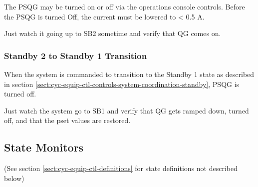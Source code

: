 \documentclass[11pt]{book}		%
\begin{document}
The PSQG may be turned on or off via the operations console controls. Before the PSQG is turned Off, the current must be lowered to < 0.5 A.

\color{red}

Just watch it going up to SB2 sometime and verify that QG comes on.

\color{black}

\subsubsection{Standby 2 to Standby 1 Transition} \label{sect:cyc-equip-ctl-beamline-quad1-state-controls-sb2tosb1}

When the system is commanded to transition to the Standby 1 state as described in section \ref{sect:cyc-equip-ctl-controls-system-coordination-standby}, PSQG is turned off.

\color{red}

Just watch the system go to SB1 and verify that QG gets ramped down, turned off, and that the pset values are restored.

\color{black}


\subsection{State Monitors} \label{sect:cyc-equip-ctl-beamline-quad1-state-monitors}
(See section \ref{sect:cyc-equip-ctl-definitions} for state definitions not described below)
\end{document}
